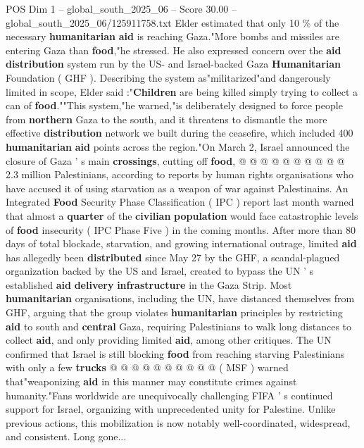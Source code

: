 \begin{textsample}{POS Dim 1 – global\_south\_2025\_06 – Score 30.00 – global\_south\_2025\_06/125911758.txt}
Elder estimated that only 10 \% of the necessary \textbf{humanitarian} \textbf{aid} is reaching Gaza."More bombs and missiles are entering Gaza than \textbf{food},"he stressed.
He also expressed concern over the \textbf{aid} \textbf{distribution} system run by the US- and Israel-backed Gaza \textbf{Humanitarian} Foundation ( GHF ).
Describing the system as"militarized"and dangerously limited in scope, Elder said :"\textbf{Children} are being killed simply trying to collect a can of \textbf{food}.""This system,"he warned,"is deliberately designed to force people from \textbf{northern} Gaza to the south, and it threatens to dismantle the more effective \textbf{distribution} network we built during the ceasefire, which included 400 \textbf{humanitarian} \textbf{aid} points across the region."On March 2, Israel announced the closure of Gaza ' s main \textbf{crossings}, cutting off \textbf{food}, @ @ @ @ @ @ @ @ @ @ 2.3 million Palestinians, according to reports by human rights organisations who have accused it of using starvation as a weapon of war against Palestinains.
An Integrated \textbf{Food} Security Phase Classification ( IPC ) report last month warned that almost a \textbf{quarter} of the \textbf{civilian} \textbf{population} would face catastrophic levels of \textbf{food} insecurity ( IPC Phase Five ) in the coming months.
After more than 80 days of total blockade, starvation, and growing international outrage, limited \textbf{aid} has allegedly been \textbf{distributed} since May 27 by the GHF, a scandal-plagued organization backed by the US and Israel, created to bypass the UN ' s established \textbf{aid} \textbf{delivery} \textbf{infrastructure} in the Gaza Strip.
Most \textbf{humanitarian} organisations, including the UN, have distanced themselves from GHF, arguing that the group violates \textbf{humanitarian} principles by restricting \textbf{aid} to south and \textbf{central} Gaza, requiring Palestinians to walk long distances to collect \textbf{aid}, and only providing limited \textbf{aid}, among other critiques.
The UN confirmed that Israel is still blocking \textbf{food} from reaching starving Palestinians with only a few \textbf{trucks} @ @ @ @ @ @ @ @ @ @ ( MSF ) warned that"weaponizing \textbf{aid} in this manner may constitute crimes against humanity."Fans worldwide are unequivocally challenging FIFA ' s continued support for Israel, organizing with unprecedented unity for Palestine.
Unlike previous actions, this mobilization is now notably well-coordinated, widespread, and consistent.
Long gone...

\end{textsample}
